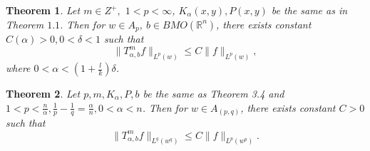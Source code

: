 \documentclass[reqno,12pt]{amsart}
\numberwithin{equation}{section}
\theoremstyle{plain}
\newtheorem{theorem}{\indent\sc Theorem}[section]
\theoremstyle{definition}
\begin{document}
\begin{theorem} Let $m\in Z^{+},$ $1<p<\infty$, $K_{\alpha}(x,y),P(x,y)$  be the same as in Theorem $1.1$. Then
for $w\in A_{p}$, $b\in BMO(\mathbb{R}^{n})$, there exists constant $C(\alpha)>0, 0<\delta<1$ such that
$$\|T^{m}_{\alpha,b}f\|_{L^{p}(w)}\leq C\|f\|_{L^{p}(w)},$$
where $0<\alpha<(1+\frac{l}{k})\delta$.
\end{theorem}

\begin{theorem} Let $p,m,K_{\alpha},P,b$ be the same as Theorem 3.4 and  $1<p<\frac{n}{\alpha}, \frac{1}{p}-\frac{1}{q}=\frac{\alpha}{n}, 0<\alpha<n$. Then
for $w\in A_{(p,q)}$, there exists constant $C>0$
such that
$$\|T^{m}_{\alpha,b}f\|_{L^{q}(w^{q})}\leq C\|f\|_{L^{p}(w^{p})}.$$
\end{theorem}
\end{document}
